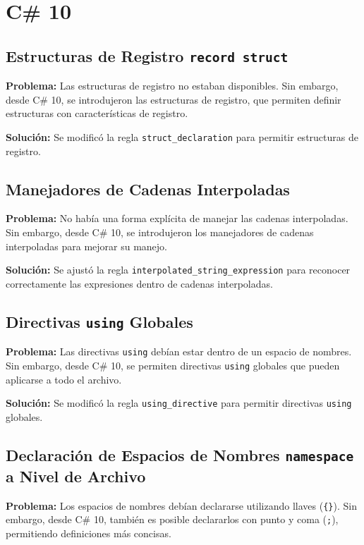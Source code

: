 \section{C\# 10}

\subsection*{Estructuras de Registro \texttt{record struct}}
\textbf{Problema:} Las estructuras de registro no estaban disponibles. Sin embargo, desde C\# 10, se introdujeron las estructuras de registro, que permiten definir estructuras con características de registro.

\textbf{Solución:} Se modificó la regla \texttt{struct\_declaration} para permitir estructuras de registro.

\subsection*{Manejadores de Cadenas Interpoladas}
\textbf{Problema:} No había una forma explícita de manejar las cadenas interpoladas. Sin embargo, desde C\# 10, se introdujeron los manejadores de cadenas interpoladas para mejorar su manejo.

\textbf{Solución:} Se ajustó la regla \texttt{interpolated\_string\_expression} para reconocer correctamente las expresiones dentro de cadenas interpoladas.

\subsection*{Directivas \texttt{using} Globales}
\textbf{Problema:} Las directivas \texttt{using} debían estar dentro de un espacio de nombres. Sin embargo, desde C\# 10, se permiten directivas \texttt{using} globales que pueden aplicarse a todo el archivo.

\textbf{Solución:} Se modificó la regla \texttt{using\_directive} para permitir directivas \texttt{using} globales.

\subsection*{Declaración de Espacios de Nombres \texttt{namespace} a Nivel de Archivo}
\textbf{Problema:} Los espacios de nombres debían declararse utilizando llaves (\texttt{\{\}}). Sin embargo, desde C\# 10, también es posible declararlos con punto y coma (\texttt{;}), permitiendo definiciones más concisas.

